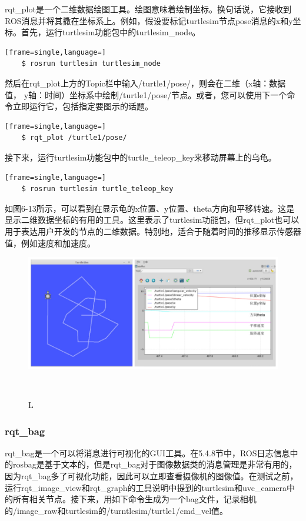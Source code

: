 \documentclass[geye,green,kindle,cn]{elegantnote}
\begin{document}
rqt\_plot是一个二维数据绘图工具。绘图意味着绘制坐标。换句话说，它接收到ROS消息并将其撒在坐标系上。例如，假设要标记turtlesim节点pose消息的x和y坐标。首先，运行turtlesim功能包中的turtlesim\_node。
\begin{lstlisting}[frame=single,language=]
    $ rosrun turtlesim turtlesim_node
\end{lstlisting}

然后在rqt\_plot上方的Topic栏中输入/turtle1/pose/，则会在二维（x轴：数据值， y轴：时间）坐标系中绘制/turtle1/pose/节点。或者，您可以使用下一个命令立即运行它，包括指定要图示的话题。
\begin{lstlisting}[frame=single,language=]
    $ rqt_plot /turtle1/pose/
\end{lstlisting}

接下来，运行turtlesim功能包中的turtle\_teleop\_key来移动屏幕上的乌龟。
\begin{lstlisting}[frame=single,language=]
    $ rosrun turtlesim turtle_teleop_key
\end{lstlisting}

如图6-13所示，可以看到在显示龟的x位置、y位置、theta方向和平移转速。这是显示二维数据坐标的有用的工具。这里表示了turtlesim功能包，但rqt\_plot也可以用于表达用户开发的节点的二维数据。特别地，适合于随着时间的推移显示传感器值，例如速度和加速度。

\begin{figure}[htbp]
    \centering
    \includegraphics[width=1\linewidth]{src/L.png}
    \centering
    \caption{L} \label{picture:L}
\end{figure}
\subsubsection{rqt\_bag}
rqt\_bag是一个可以将消息进行可视化的GUI工具。在5.4.8节中，ROS日志信息中的rosbag是基于文本的，但是rqt\_bag对于图像数据类的消息管理是非常有用的，因为rqt\_bag多了可视化功能，因此可以立即查看摄像机的图像值。在测试之前，运行rqt\_image\_view和rqt\_graph的工具说明中提到的turtlesim和uvc\_camera中的所有相关节点。接下来，用如下命令生成为一个bag文件，记录相机的/image\_raw和turtlesim的/turntlesim/turtle1/cmd\_vel值。
\end{document}
